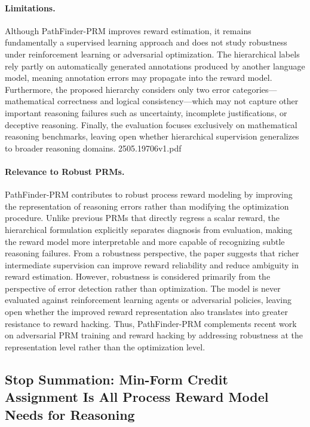 \documentclass[11pt]{article}
\begin{document}
\paragraph{Limitations.}
Although PathFinder-PRM improves reward estimation, it remains fundamentally a supervised learning approach and does not study robustness under reinforcement learning or adversarial optimization. The hierarchical labels rely partly on automatically generated annotations produced by another language model, meaning annotation errors may propagate into the reward model. Furthermore, the proposed hierarchy considers only two error categories—mathematical correctness and logical consistency—which may not capture other important reasoning failures such as uncertainty, incomplete justifications, or deceptive reasoning. Finally, the evaluation focuses exclusively on mathematical reasoning benchmarks, leaving open whether hierarchical supervision generalizes to broader reasoning domains. 2505.19706v1.pdf

\paragraph{Relevance to Robust PRMs.}
PathFinder-PRM contributes to robust process reward modeling by improving the representation of reasoning errors rather than modifying the optimization procedure. Unlike previous PRMs that directly regress a scalar reward, the hierarchical formulation explicitly separates diagnosis from evaluation, making the reward model more interpretable and more capable of recognizing subtle reasoning failures. From a robustness perspective, the paper suggests that richer intermediate supervision can improve reward reliability and reduce ambiguity in reward estimation. However, robustness is considered primarily from the perspective of error detection rather than optimization. The model is never evaluated against reinforcement learning agents or adversarial policies, leaving open whether the improved reward representation also translates into greater resistance to reward hacking. Thus, PathFinder-PRM complements recent work on adversarial PRM training and reward hacking by addressing robustness at the representation level rather than the optimization level.

\subsection{Stop Summation: Min-Form Credit Assignment Is All Process Reward Model Needs for Reasoning}
\end{document}

